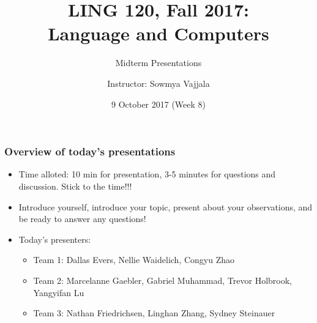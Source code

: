 \documentclass{beamer}
\author[Sowmya Vajjala]{Instructor: Sowmya Vajjala}
\title[LING 120]{LING 120, Fall 2017: \\ Language and Computers}
\subtitle{Midterm Presentations}
\date{9 October 2017 (Week 8)}
\institute{Iowa State University, USA}
\begin{document}
\begin{frame}\titlepage
\end{frame}

\begin{frame}%
\frametitle{Overview of today's presentations}
\begin{itemize}
\item Time alloted: 10 min for presentation, 3-5 minutes for questions and discussion. Stick to the time!!!
\item Introduce yourself, introduce your topic, present about your observations, and be ready to answer any questions!
\item Today's presenters: 
\begin{itemize}
\item Team 1: Dallas Evers, Nellie Waidelich, Congyu Zhao
\item Team 2: Marcelanne Gaebler, Gabriel Muhammad, Trevor Holbrook, Yangyifan Lu
\item Team 3: Nathan Friedrichsen, Linghan Zhang, Sydney Steinauer
\end{itemize}
\end{itemize}
\end{frame}
\end{document}
